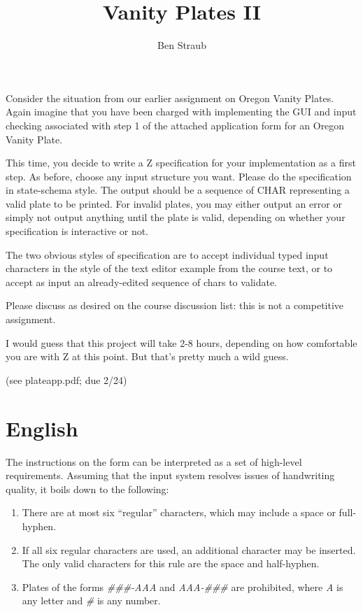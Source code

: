 \documentclass[11pt]{article}
\begin{document}
\title{Vanity Plates II}
\author{Ben Straub}
\maketitle

\iftypechecker
Consider the situation from our earlier assignment on Oregon Vanity Plates. Again imagine that you
have been charged with implementing the GUI and input checking associated with step 1 of the
attached application form for an Oregon Vanity Plate.

This time, you decide to write a Z specification for your implementation as a first step. As before,
choose any input structure you want. Please do the specification in state-schema style. The output
should be a sequence of CHAR representing a valid plate to be printed. For invalid plates, you may
either output an error or simply not output anything until the plate is valid, depending on whether
your specification is interactive or not.

The two obvious styles of specification are to accept individual typed input characters in the style
of the text editor example from the course text, or to accept as input an already-edited sequence of
chars to validate.

Please discuss as desired on the course discussion list: this is not a competitive assignment.

I would guess that this project will take 2-8 hours, depending on how comfortable you are with Z at
this point. But that's pretty much a wild guess.

(see plateapp.pdf; due 2/24)
\fi

\section{English}
The instructions on the form can be interpreted as a set of high-level requirements.  Assuming that
the input system resolves issues of handwriting quality, it boils down to the following:

\begin{enumerate}
\item \label{e:len} There are at most six ``regular'' characters, which may include a space or
  full-hyphen.
\item \label{e:chr} If all six regular characters are used, an additional character may be
  inserted.  The only valid characters for this rule are the space and half-hyphen.
\item \label{e:pat} Plates of the forms \textit{\#\#\#-AAA} and \textit{AAA-\#\#\#} are prohibited,
  where \textit{A} is any letter and \textit{\#} is any number.
\end{enumerate}
\end{document}

